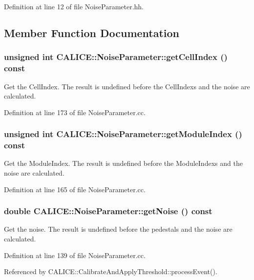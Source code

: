 Definition at line 12 of file NoiseParameter.hh.

\subsection{Member Function Documentation}
\subsubsection[{getCellIndex}]{\setlength{\rightskip}{0pt plus 5cm}unsigned int CALICE::NoiseParameter::getCellIndex () const}\label{classCALICE_1_1NoiseParameter_affdf12ec2ffea77fcb05ffd16e26d48a}


Get the CellIndex. The result is undefined before the CellIndexs and the noise are calculated. 

Definition at line 173 of file NoiseParameter.cc.
\subsubsection[{getModuleIndex}]{\setlength{\rightskip}{0pt plus 5cm}unsigned int CALICE::NoiseParameter::getModuleIndex () const}\label{classCALICE_1_1NoiseParameter_af2c390e2f9d1c9973961045e444e6120}


Get the ModuleIndex. The result is undefined before the ModuleIndexs and the noise are calculated. 

Definition at line 165 of file NoiseParameter.cc.
\subsubsection[{getNoise}]{\setlength{\rightskip}{0pt plus 5cm}double CALICE::NoiseParameter::getNoise () const}\label{classCALICE_1_1NoiseParameter_a25c5efb36b96a6d55f475d7721585d87}


Get the noise. The result is undefined before the pedestals and the noise are calculated. 

Definition at line 139 of file NoiseParameter.cc.

Referenced by CALICE::CalibrateAndApplyThreshold::processEvent().
